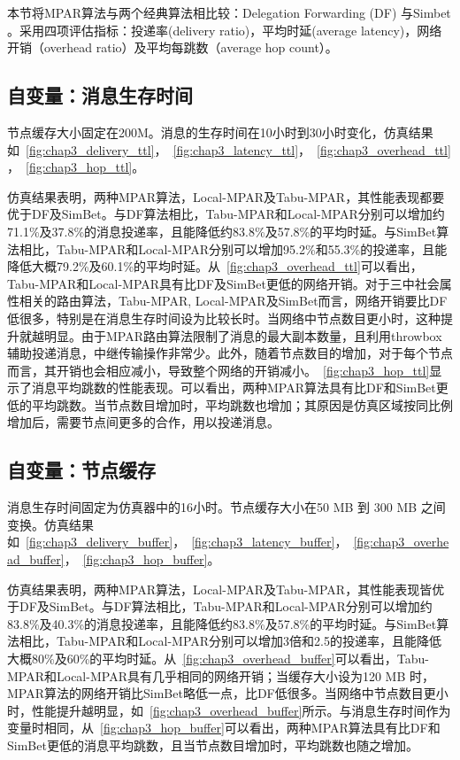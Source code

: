 本节将MPAR算法与两个经典算法相比较：Delegation Forwarding (DF) \cite{Erramilli2008}与Simbet \cite{Daly2007}。采用四项评估指标：投递率(delivery ratio)，平均时延(average latency)，网络开销（overhead ratio）及平均每跳数（average hop count）。



\subsection{自变量：消息生存时间}

节点缓存大小固定在200M。消息的生存时间在10小时到30小时变化，仿真结果如\figurename~\ref{fig:chap3_delivery_ttl}，\figurename~\ref{fig:chap3_latency_ttl}，\figurename~\ref{fig:chap3_overhead_ttl}，\figurename~\ref{fig:chap3_hop_ttl}。

仿真结果表明，两种MPAR算法，Local-MPAR及Tabu-MPAR，其性能表现都要优于DF及SimBet。与DF算法相比，Tabu-MPAR和Local-MPAR分别可以增加约71.1\%及37.8\%的消息投递率，且能降低约83.8\%及57.8\%的平均时延。与SimBet算法相比，Tabu-MPAR和Local-MPAR分别可以增加95.2\%和55.3\%的投递率，且能降低大概79.2\%及60.1\%的平均时延。从\figurename~\ref{fig:chap3_overhead_ttl}可以看出，Tabu-MPAR和Local-MPAR具有比DF及SimBet更低的网络开销。对于三中社会属性相关的路由算法，Tabu-MPAR, Local-MPAR及SimBet而言，网络开销要比DF低很多，特别是在消息生存时间设为比较长时。当网络中节点数目更小时，这种提升就越明显。由于MPAR路由算法限制了消息的最大副本数量，且利用throwbox辅助投递消息，中继传输操作非常少。此外，随着节点数目的增加，对于每个节点而言，其开销也会相应减小，导致整个网络的开销减小。\figurename~\ref{fig:chap3_hop_ttl}显示了消息平均跳数的性能表现。可以看出，两种MPAR算法具有比DF和SimBet更低的平均跳数。当节点数目增加时，平均跳数也增加；其原因是仿真区域按同比例增加后，需要节点间更多的合作，用以投递消息。



\subsection{自变量：节点缓存}

消息生存时间固定为仿真器中的16小时。节点缓存大小在50 MB 到 300 MB 之间变换。仿真结果如\figurename~\ref{fig:chap3_delivery_buffer}，\figurename~\ref{fig:chap3_latency_buffer}，\figurename~\ref{fig:chap3_overhead_buffer}，\figurename~\ref{fig:chap3_hop_buffer}。

仿真结果表明，两种MPAR算法，Local-MPAR及Tabu-MPAR，其性能表现皆优于DF及SimBet。与DF算法相比，Tabu-MPAR和Local-MPAR分别可以增加约83.8\%及40.3\%的消息投递率，且能降低约83.8\%及57.8\%的平均时延。与SimBet算法相比，Tabu-MPAR和Local-MPAR分别可以增加3倍和2.5的投递率，且能降低大概80\%及60\%的平均时延。从\figurename~\ref{fig:chap3_overhead_buffer}可以看出，Tabu-MPAR和Local-MPAR具有几乎相同的网络开销；当缓存大小设为120 MB 时，MPAR算法的网络开销比SimBet略低一点，比DF低很多。当网络中节点数目更小时，性能提升越明显，如\figurename~\ref{fig:chap3_overhead_buffer}所示。与消息生存时间作为变量时相同，从\figurename~\ref{fig:chap3_hop_buffer}可以看出，两种MPAR算法具有比DF和SimBet更低的消息平均跳数，且当节点数目增加时，平均跳数也随之增加。


